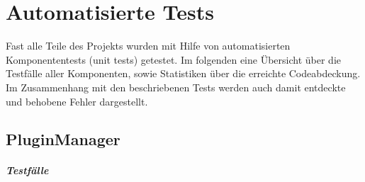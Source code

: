 \chapter{Automatisierte Tests}
Fast alle Teile des Projekts wurden mit Hilfe von automatisierten Komponententests (unit tests) getestet. Im folgenden eine Übersicht über die Testfälle aller Komponenten, sowie Statistiken über die erreichte Codeabdeckung.
Im Zusammenhang mit den beschriebenen Tests werden auch damit entdeckte und behobene Fehler dargestellt.


\section{PluginManager}
\paragraph*{Testfälle}
